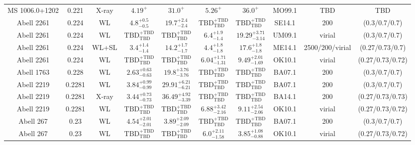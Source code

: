 \begin{table}
\begin{tabular}{cccccccccc}
MS 1006.0+1202 & 0.221 & X-ray & ${4.19}^{+}_{}$ & ${31.0}^{+}_{}$ & ${5.26}^{+}_{}$ & ${36.0}^{+}_{}$ & MO99.1 & TBD & TBD \\
Abell 2261 & 0.224 & WL & ${4.8}^{+0.5}_{-0.5}$ & ${19.7}^{+2.4}_{-2.4}$ & ${\mathrm{TBD}}^{+\mathrm{TBD}}_{\mathrm{TBD}}$ & ${\mathrm{TBD}}^{+\mathrm{TBD}}_{\mathrm{TBD}}$ & SE14.1 & 200 & (0.3/0.7/0.7) \\
Abell 2261 & 0.224 & WL & ${\mathrm{TBD}}^{+\mathrm{TBD}}_{\mathrm{TBD}}$ & ${\mathrm{TBD}}^{+\mathrm{TBD}}_{\mathrm{TBD}}$ & ${6.4}^{+1.9}_{-1.4}$ & ${19.29}^{+3.71}_{-3.14}$ & UM09.1 & virial & (0.3/0.7/0.7) \\
Abell 2261 & 0.224 & WL+SL & ${3.4}^{+1.4}_{-1.4}$ & ${14.2}^{+1.7}_{-1.7}$ & ${4.4}^{+1.8}_{-1.8}$ & ${17.6}^{+1.8}_{-1.8}$ & ME14.1 & 2500/200/virial & (0.27/0.73/0.7) \\
Abell 2261 & 0.224 & WL & ${\mathrm{TBD}}^{+\mathrm{TBD}}_{\mathrm{TBD}}$ & ${\mathrm{TBD}}^{+\mathrm{TBD}}_{\mathrm{TBD}}$ & ${6.04}^{+1.71}_{-1.31}$ & ${9.49}^{+2.01}_{-1.69}$ & OK10.1 & virial & (0.27/0.73/0.72) \\
Abell 1763 & 0.228 & WL & ${2.63}^{+0.63}_{-0.63}$ & ${19.8}^{+3.76}_{-3.76}$ & ${\mathrm{TBD}}^{+\mathrm{TBD}}_{\mathrm{TBD}}$ & ${\mathrm{TBD}}^{+\mathrm{TBD}}_{\mathrm{TBD}}$ & BA07.1 & 200 & (0.3/0.7/0.7) \\
Abell 2219 & 0.2281 & WL & ${3.84}^{+0.99}_{-0.99}$ & ${29.91}^{+6.21}_{-6.21}$ & ${\mathrm{TBD}}^{+\mathrm{TBD}}_{\mathrm{TBD}}$ & ${\mathrm{TBD}}^{+\mathrm{TBD}}_{\mathrm{TBD}}$ & BA07.1 & 200 & (0.3/0.7/0.7) \\
Abell 2219 & 0.2281 & X-ray & ${3.44}^{+0.73}_{-0.73}$ & ${36.49}^{+4.92}_{-3.39}$ & ${\mathrm{TBD}}^{+\mathrm{TBD}}_{\mathrm{TBD}}$ & ${\mathrm{TBD}}^{+\mathrm{TBD}}_{\mathrm{TBD}}$ & BA14.1 & 200 & (0.27/0.73/0.73) \\
Abell 2219 & 0.2281 & WL & ${\mathrm{TBD}}^{+\mathrm{TBD}}_{\mathrm{TBD}}$ & ${\mathrm{TBD}}^{+\mathrm{TBD}}_{\mathrm{TBD}}$ & ${6.88}^{+3.42}_{-2.16}$ & ${9.11}^{+2.54}_{-2.06}$ & OK10.1 & virial & (0.27/0.73/0.72) \\
Abell 267 & 0.23 & WL & ${4.54}^{+2.01}_{-2.01}$ & ${3.89}^{+2.09}_{-2.09}$ & ${\mathrm{TBD}}^{+\mathrm{TBD}}_{\mathrm{TBD}}$ & ${\mathrm{TBD}}^{+\mathrm{TBD}}_{\mathrm{TBD}}$ & BA07.1 & 200 & (0.3/0.7/0.7) \\
Abell 267 & 0.23 & WL & ${\mathrm{TBD}}^{+\mathrm{TBD}}_{\mathrm{TBD}}$ & ${\mathrm{TBD}}^{+\mathrm{TBD}}_{\mathrm{TBD}}$ & ${6.0}^{+2.11}_{-1.58}$ & ${3.85}^{+1.08}_{-0.88}$ & OK10.1 & virial & (0.27/0.73/0.72) \\

\end{tabular}
\end{table}
